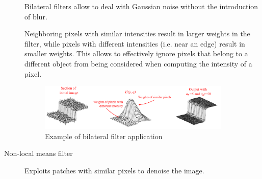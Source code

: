 \begin{description}
        \begin{remark}
            Bilateral filters allow to deal with Gaussian noise without the introduction of blur.
        \end{remark}

        \begin{remark}
            Neighboring pixels with similar intensities result in larger weights in the filter,
            while pixels with different intensities (i.e. near an edge) result in smaller weights.
            This allows to effectively ignore pixels that belong to a different object from being considered when computing the intensity of a pixel.
        \end{remark}

        \begin{figure}[H]
            \centering
            \includegraphics[width=0.9\textwidth]{./img/_bilateral_filter_example.pdf}
            \caption{Example of bilateral filter application}
        \end{figure}

    
    \item[Non-local means filter] 
        Exploits patches with similar pixels to denoise the image.


\end{description}
